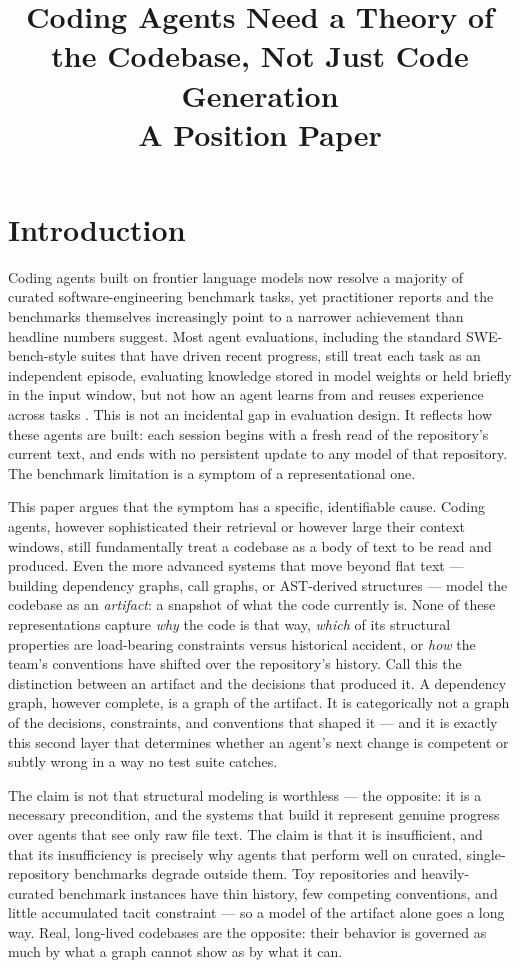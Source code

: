\documentclass[11pt]{article}
\title{Coding Agents Need a Theory of the Codebase, Not Just Code Generation \\ \large A Position Paper}
\author{}
\date{}
\begin{document}
\maketitle

\section{Introduction}

Coding agents built on frontier language models now resolve a majority of curated software-engineering benchmark tasks, yet practitioner reports and the benchmarks themselves increasingly point to a narrower achievement than headline numbers suggest. Most agent evaluations, including the standard SWE-bench-style suites that have driven recent progress, still treat each task as an independent episode, evaluating knowledge stored in model weights or held briefly in the input window, but not how an agent learns from and reuses experience across tasks \citep{zhu2026swecontextbench}. This is not an incidental gap in evaluation design. It reflects how these agents are built: each session begins with a fresh read of the repository's current text, and ends with no persistent update to any model of that repository. The benchmark limitation is a symptom of a representational one.

This paper argues that the symptom has a specific, identifiable cause. Coding agents, however sophisticated their retrieval or however large their context windows, still fundamentally treat a codebase as a body of text to be read and produced. Even the more advanced systems that move beyond flat text --- building dependency graphs, call graphs, or AST-derived structures --- model the codebase as an \emph{artifact}: a snapshot of what the code currently is. None of these representations capture \emph{why} the code is that way, \emph{which} of its structural properties are load-bearing constraints versus historical accident, or \emph{how} the team's conventions have shifted over the repository's history. Call this the distinction between an artifact and the decisions that produced it. A dependency graph, however complete, is a graph of the artifact. It is categorically not a graph of the decisions, constraints, and conventions that shaped it --- and it is exactly this second layer that determines whether an agent's next change is competent or subtly wrong in a way no test suite catches.

The claim is not that structural modeling is worthless --- the opposite: it is a necessary precondition, and the systems that build it represent genuine progress over agents that see only raw file text. The claim is that it is insufficient, and that its insufficiency is precisely why agents that perform well on curated, single-repository benchmarks degrade outside them. Toy repositories and heavily-curated benchmark instances have thin history, few competing conventions, and little accumulated tacit constraint --- so a model of the artifact alone goes a long way. Real, long-lived codebases are the opposite: their behavior is governed as much by what a graph cannot show as by what it can.
\end{document}
